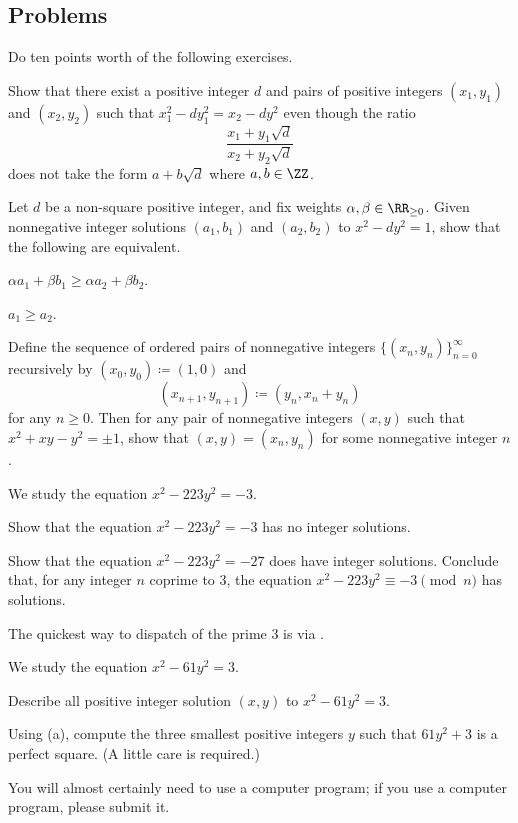 \documentclass[../notes.tex]{subfiles}
\begin{document}
\subsection{Problems}
Do ten points worth of the following exercises.
\begin{prob}[2 points] \label{prob:norm-equal-not-unit-ratio}
	Show that there exist a positive integer $d$ and pairs of positive integers $(x_1,y_1)$ and $(x_2,y_2)$ such that $x_1^2-dy_1^2=x_2-dy^2$ even though the ratio
	\[\frac{x_1+y_1\sqrt d}{x_2+y_2\sqrt d}\]
	does not take the form $a+b\sqrt d$ where $a,b\in\ZZ$.
\end{prob}
\begin{prob}[2 points] \label{prob:fund-unit-is-really-smallest}
	Let $d$ be a non-square positive integer, and fix weights $\alpha,\beta\in\RR_{\ge0}$. Given nonnegative integer solutions $(a_1,b_1)$ and $(a_2,b_2)$ to $x^2-dy^2=1$, show that the following are equivalent.
	\begin{listalph}
		\item $\alpha a_1+\beta b_1\ge\alpha a_2+\beta b_2$.
		\item $a_1\ge a_2$.
	\end{listalph}
\end{prob}
\begin{prob}[4 points] \label{prob:pell-5-norm}
	Define the sequence of ordered pairs of nonnegative integers $\{(x_n,y_n)\}_{n=0}^\infty$ recursively by $(x_0,y_0)\coloneqq(1,0)$ and
	\[(x_{n+1},y_{n+1})\coloneqq(y_n,x_n+y_n)\]
	for any $n\ge0$. Then for any pair of nonnegative integers $(x,y)$ such that $x^2+xy-y^2=\pm1$, show that $(x,y)=(x_n,y_n)$ for some nonnegative integer $n$.
\end{prob}
\begin{prob}[4 points] \label{prob:norm-223}
	We study the equation $x^2-223y^2=-3$.
	\begin{listalph}
		\item Show that the equation $x^2-223y^2=-3$ has no integer solutions.
		\item Show that the equation $x^2-223y^2=-27$ does have integer solutions. Conclude that, for any integer $n$ coprime to $3$, the equation $x^2-223y^2\equiv-3\pmod n$  has solutions.
	\end{listalph}
	The quickest way to dispatch of the prime $3$ is via .
\end{prob}
\begin{prob}[5 points]
	We study the equation $x^2-61y^2=3$.
	\begin{listalph}
		\item Describe all positive integer solution $(x,y)$ to $x^2-61y^2=3$.
		\item Using (a), compute the three smallest positive integers $y$ such that $61y^2+3$ is a perfect square. (A little care is required.)
	\end{listalph}
	You will almost certainly need to use a computer program; if you use a computer program, please submit it.
\end{prob}
\end{document}
